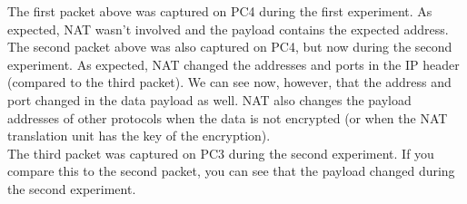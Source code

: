 

The first packet above was captured on PC4 during the first experiment. As expected, NAT wasn't involved and the payload contains the expected address. \\
The second packet above was also captured on PC4, but now during the second experiment. As expected, NAT changed the addresses and ports in the IP header (compared to the third packet). We can see now, however, that the address and port changed in the data payload as well. NAT also changes the payload addresses of other protocols when the data is not encrypted (or when the NAT translation unit has the key of the encryption). \\
The third packet was captured on PC3 during the second experiment. If you compare this to the second packet, you can see that the payload changed during the second experiment.
